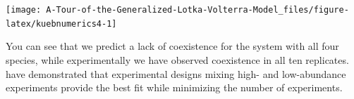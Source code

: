 \documentclass[]{book}
\newenvironment{Shaded}{\begin{snugshade}}{\end{snugshade}}
\newcommand{\DataTypeTok}[1]{\textcolor[rgb]{0.13,0.29,0.53}{#1}}
\newcommand{\DecValTok}[1]{\textcolor[rgb]{0.00,0.00,0.81}{#1}}
\newcommand{\KeywordTok}[1]{\textcolor[rgb]{0.13,0.29,0.53}{\textbf{#1}}}
\newcommand{\NormalTok}[1]{#1}
\newcommand{\OperatorTok}[1]{\textcolor[rgb]{0.81,0.36,0.00}{\textbf{#1}}}
\newcommand{\StringTok}[1]{\textcolor[rgb]{0.31,0.60,0.02}{#1}}
\begin{document}
\begin{Shaded}
\end{Shaded}

\begin{center}\texttt{[image: A-Tour-of-the-Generalized-Lotka-Volterra-Model\_files/figure-latex/kuebnumerics4-1]} \end{center}

You can see that we predict a lack of coexistence for the system with all four species, while experimentally we have observed coexistence in all ten replicates. \citet{maynard2019predicting} have demonstrated that experimental designs mixing high- and low-abundance experiments provide the best fit while minimizing the number of experiments.


\end{document}
